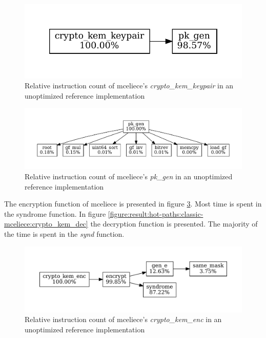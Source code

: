 \begin{figure}[H]
    \centering
    \includegraphics[scale=0.5]{chapters/results/hot-paths/classic-mceliece/8192128/crypto_kem_keypair.pdf}
    \caption{Relative instruction count of \gls{mceliece}'s \textit{crypto\_kem\_keypair} in an unoptimized reference implementation}
    \label{figure:result:hot-paths:classic-mceliece:crypto_kem_keypair}
\end{figure}

\begin{figure}[H]
    \centering
    \includegraphics[scale=0.5]{chapters/results/hot-paths/classic-mceliece/8192128/pk_gen.pdf}
    \caption{Relative instruction count of \gls{mceliece}'s \textit{pk\_gen} in an unoptimized reference implementation}
    \label{figure:result:hot-paths:classic-mceliece:pk_gen}
\end{figure}

\noindent The encryption function of \gls{mceliece} is presented in figure \ref{figure:result:hot-paths:classic-mceliece:crypto_kem_enc}. Most time is spent in the syndrome function. In figure \ref{figure:result:hot-paths:classic-mceliece:crypto_kem_dec} the decryption function is presented. The majority of the time is spent in the \textit{synd} function.

\begin{figure}[H]
    \centering
    \includegraphics[scale=0.5]{chapters/results/hot-paths/classic-mceliece/8192128/crypto_kem_enc.pdf}
    \caption{Relative instruction count of \gls{mceliece}'s \textit{crypto\_kem\_enc} in an unoptimized reference implementation}
    \label{figure:result:hot-paths:classic-mceliece:crypto_kem_enc}
\end{figure}


